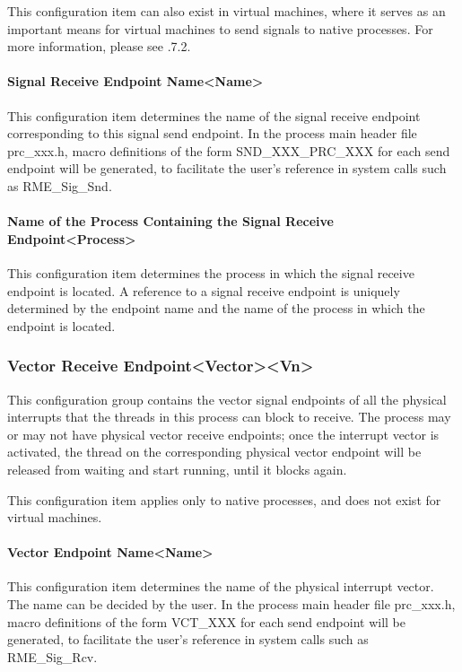 This configuration item can also exist in virtual machines, where it serves as an important means for virtual machines to send signals to native processes. For more information, please see .7.2.

\paragraph{Signal Receive Endpoint Name<Name>{}}\label{par:5-3-14-20-1}

This configuration item determines the name of the signal receive endpoint corresponding to this signal send endpoint. In the process main header file prc\_xxx.h, macro definitions of the form SND\_XXX\_PRC\_XXX for each send endpoint will be generated, to facilitate the user's reference in system calls such as RME\_Sig\_Snd.

\paragraph{Name of the Process Containing the Signal Receive Endpoint<Process>{}}\label{par:5-3-14-20-2}

This configuration item determines the process in which the signal receive endpoint is located. A reference to a signal receive endpoint is uniquely determined by the endpoint name and the name of the process in which the endpoint is located.

\subsubsection{Vector Receive Endpoint<Vector><Vn>{}}\label{subsubsec:5-3-14-21}

This configuration group contains the vector signal endpoints of all the physical interrupts that the threads in this process can block to receive. The process may or may not have physical vector receive endpoints; once the interrupt vector is activated, the thread on the corresponding physical vector endpoint will be released from waiting and start running, until it blocks again.

This configuration item applies only to native processes, and does not exist for virtual machines.

\paragraph{Vector Endpoint Name<Name>{}}\label{par:5-3-14-21-1}

This configuration item determines the name of the physical interrupt vector. The name can be decided by the user. In the process main header file prc\_xxx.h, macro definitions of the form VCT\_XXX for each send endpoint will be generated, to facilitate the user's reference in system calls such as RME\_Sig\_Rcv.

